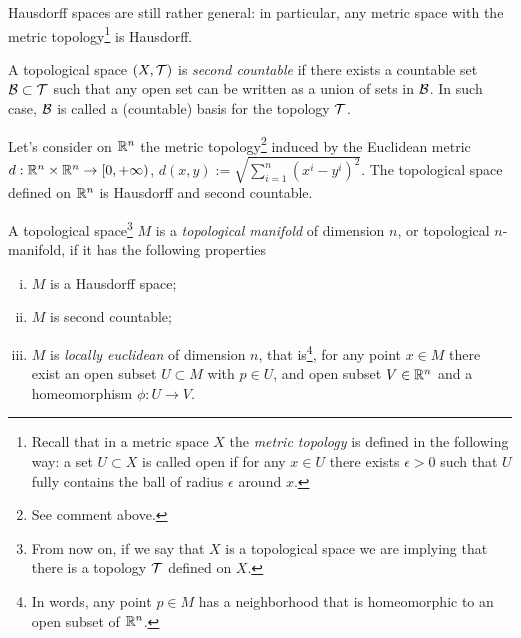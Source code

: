 Hausdorff spaces are still rather general: in particular, any metric space with the metric topology\footnote{Recall that in a metric space $X$ the \emph{metric topology} is defined in the following way: a set $U\subset X$ is called open if for any $x\in U$ there exists $\epsilon>0$ such that $U$ fully contains the ball of radius $\epsilon$ around $x$.} is Hausdorff.

\begin{defn}
  A topological space $(X, \mathcal{T})$ is \emph{second countable} if there exists a countable set $\mathcal{B}\subset\mathcal{T}$ such that any open set can be written as a union of sets in $\mathcal{B}$.
  In such case, $\mathcal{B}$ is called a (countable) basis for the topology $\mathcal{T}$.
\end{defn}

\begin{exe}\label{exe:rntopsp}
  Let's consider on $\mathbb{R}^n$ the metric topology\footnote{See comment above.} induced by the Euclidean metric $d: \mathbb{R}^n \times \mathbb{R}^n \to [0, +\infty)$, $d(x,y) := \sqrt{\sum_{i=1}^n (x^i-y^i)^2}$.
  The topological space defined on $\mathbb{R}^n$ is Hausdorff and second countable.
\end{exe}

\begin{defn}
  A topological space\footnote{From now on, if we say that $X$ is a topological space we are implying that there is a topology $\mathcal{T}$ defined on $X$.} $M$ is a \emph{topological manifold} of dimension $n$, or topological $n$-manifold, if it has the following properties
  \begin{enumerate}[(i)]
    \item $M$ is a Hausdorff space;
    \item $M$ is second countable;
    \item $M$ is \emph{locally euclidean} of dimension $n$, that is\footnote{In words, any point $p\in M$ has a neighborhood that is homeomorphic to an open subset of $\mathbb{R}^n$.}, for any point $x\in M$ there exist an open subset $U\subset M$ with $p\in U$, and open subset $V\in\mathbb{R}^n$ and a homeomorphism $\phi: U\to V$.
  \end{enumerate}
\end{defn}

